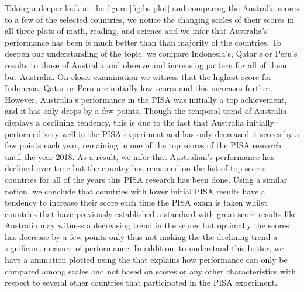 Taking a deeper look at the figure \ref{fig:bs-plot} and comparing the
Australia scores to a few of the selected countries, we notice the
changing scales of their scores in all three plots of math, reading, and
science and we infer that Australia's performance has been is much
better than than majority of the countries. To deepen our understanding
of the topic, we compare Indonesia's, Qatar's or Peru's results to those
of Australia and observe and increasing pattern for all of them but
Australia. On closer examination we witness that the highest score for
Indonesia, Qatar or Peru are initially low scores and this increases
further. However, Australia's performance in the PISA was initially a
top achievement, and it has only drops by a few points. Though the
temporal trend of Australia displays a declining tendency, this is due
to the fact that Australia initially performed very well in the PISA
experiment and has only decreased it scores by a few points each year,
remaining in one of the top scores of the PISA research until the year
2018. As a result, we infer that Australian's performance has declined
over time but the country has remained on the list of top scores
countries for all of the years this PISA research has been done. Using a
similar notion, we conclude that countries with lower initial PISA
results have a tendency to increase their score each time the PISA exam
is taken whilst countries that have previously established a standard
with great score results like Australia may witness a decreasing trend
in the scores but optimally the scores has decrease by a few points only
thus not making the the declining trend a significant measure of
performance. In addition, to understand this better, we have a animation
plotted using  \citep{gganimate} the that explains
how performance can only be compared among scales and not based on
scores or any other characteristics with respect to several other
countries that participated in the PISA experiment.



\address{%
Priya Ravindra Dingorkar\\
Monash University\\%
Department of Econometrics and Business Statistics\\ Clayton,
Australia\\
%
\url{https://www.linkedin.com/in/priya-dingorkar/}\\%
%
\href{mailto:priyadingorkar@gmail.com}{\nolinkurl{priyadingorkar@gmail.com}}%
}

